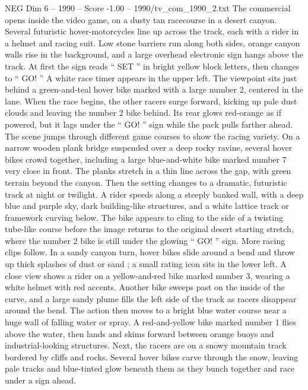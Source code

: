 \begin{textsample}{NEG Dim 6 – 1990 – Score -1.00 – 1990/tv\_com\_1990\_2.txt}  \label{ex:f6_neg_025}
The commercial opens inside the video game, on a dusty tan racecourse in a desert canyon.
Several futuristic hover-motorcycles line up across the track, each with a rider in a helmet and racing suit.
Low stone barriers run along both sides, orange canyon walls rise in the background, and a large overhead electronic sign hangs above the track.
At first the sign reads “ SET ” in bright yellow block letters, then changes to “ GO! ” A white race timer appears in the upper left.
The viewpoint sits just behind a green-and-teal hover bike marked with a large number 2, centered in the lane.
When the race begins, the other racers surge forward, kicking up pale dust clouds and leaving the number 2 bike behind.
Its rear glows red-orange as if powered, but it lags under the “ GO! ” sign while the pack pulls farther ahead.
The scene jumps through different game courses to show the racing variety.
On a narrow wooden plank bridge suspended over a deep rocky ravine, several hover bikes crowd together, including a large blue-and-white bike marked number 7 very close in front.
The planks stretch in a thin line across the gap, with green terrain beyond the canyon.
Then the setting changes to a dramatic, futuristic track at night or twilight.
A rider speeds along a steeply banked wall, with a deep blue and purple sky, dark building-like structures, and a white lattice track or framework curving below.
The bike appears to cling to the side of a twisting tube-like course before the image returns to the original desert starting stretch, where the number 2 bike is still under the glowing “ GO! ” sign.
More racing clips follow.
In a sandy canyon turn, hover bikes slide around a bend and throw up thick splashes of dust or sand ; a small rating icon sits in the lower left.
A close view shows a rider on a yellow-and-red bike marked number 3, wearing a white helmet with red accents.
Another bike sweeps past on the inside of the curve, and a large sandy plume fills the left side of the track as racers disappear around the bend.
The action then moves to a bright blue water course near a huge wall of falling water or spray.
A red-and-yellow bike marked number 1 flies above the water, then lands and skims forward between orange buoys and industrial-looking structures.
Next, the racers are on a snowy mountain track bordered by cliffs and rocks.
Several hover bikes carve through the snow, leaving pale tracks and blue-tinted glow beneath them as they bunch together and race under a sign ahead.

\end{textsample}
